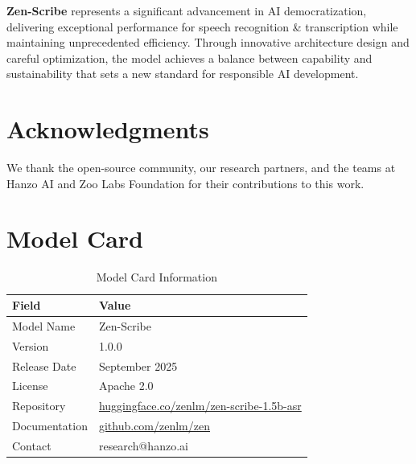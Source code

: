 \documentclass[11pt,a4paper]{article}
\begin{document}
\textbf{Zen-Scribe} represents a significant advancement in AI democratization, 
delivering exceptional performance for speech recognition \& transcription while maintaining 
unprecedented efficiency. Through innovative architecture design and careful optimization, 
the model achieves a balance between capability and sustainability that sets a new standard 
for responsible AI development.

\section*{Acknowledgments}

We thank the open-source community, our research partners, and the teams at Hanzo AI and 
Zoo Labs Foundation for their contributions to this work.

\appendix

\section{Model Card}

\begin{table}[H]
\centering
\begin{tabular}{ll}
\toprule
\textbf{Field} & \textbf{Value} \\
\midrule
Model Name & Zen-Scribe \\
Version & 1.0.0 \\
Release Date & September 2025 \\
License & Apache 2.0 \\
Repository & \href{https://huggingface.co/zenlm/zen-scribe-1.5b-asr}{huggingface.co/zenlm/zen-scribe-1.5b-asr} \\
Documentation & \href{https://github.com/zenlm/zen}{github.com/zenlm/zen} \\
Contact & research@hanzo.ai \\
\bottomrule
\end{tabular}
\caption{Model Card Information}
\end{table}
\end{document}
